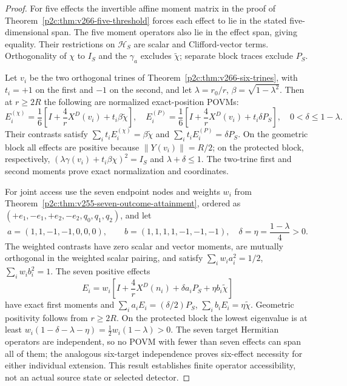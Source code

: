 \documentclass[12pt,a4paper]{article}
\begin{document}
\begin{proof}
For five effects the invertible affine moment matrix in the proof of
Theorem~\ref{p2c:thm:v266-five-threshold} forces each effect to lie
in the stated five-dimensional span. The five moment operators
also lie in the effect span, giving equality. Their restrictions on
$\mathcal H_S$ are scalar and Clifford-vector terms. Orthogonality of
$\chi$ to $I_S$ and the $\gamma_a$ excludes $\widetilde\chi$;
separate block traces exclude $P_S$.

Let $v_i$ be the two orthogonal trines of
Theorem~\ref{p2c:thm:v266-six-trines}, with $t_i=+1$ on the first
and $-1$ on the second, and let $\lambda=r_0/r$, $\beta=\sqrt{1-\lambda^2}$.
Then at $r\ge2R$ the following are normalized exact-position POVMs:
\[
E_i^{(\chi)}=\frac16\left[I+\frac4rX^D(v_i)+t_i\beta\widetilde\chi\right],
\quad
E_i^{(P)}=\frac16\left[I+\frac4rX^D(v_i)+t_i\delta P_S\right],
\quad 0<\delta\le1-\lambda.
\]
Their contrasts satisfy
$\sum_it_iE_i^{(\chi)}=\beta\widetilde\chi$ and
$\sum_it_iE_i^{(P)}=\delta P_S$.
On the geometric block all effects are positive because
$\|Y(v_i)\|=R/2$; on the protected block, respectively,
$(\lambda\gamma(v_i)+t_i\beta\chi)^2=I_S$ and
$\lambda+\delta\le1$. The two-trine first and second moments
prove exact normalization and coordinates.

For joint access use the seven endpoint nodes and weights $w_i$
from Theorem~\ref{p2c:thm:v255-seven-outcome-attainment}, ordered as
$(+e_1,-e_1,+e_2,-e_2,q_0,q_1,q_2)$, and let
\[
a=(1,1,-1,-1,0,0,0),\qquad b=(1,1,1,1,-1,-1,-1),
\quad\delta=\eta=\frac{1-\lambda}{4}>0.
\]
The weighted contrasts have zero scalar and vector moments, are
mutually orthogonal in the weighted scalar pairing, and satisfy
$\sum_iw_ia_i^2=1/2$, $\sum_iw_ib_i^2=1$.
The seven positive effects
\[
\boxed{E_i=w_i\left[I+\frac4rX^D(n_i)+
\delta a_iP_S+\eta b_i\widetilde\chi\right]}
\]
have exact first moments and
$\sum_ia_iE_i=(\delta/2)P_S$,
$\sum_ib_iE_i=\eta\widetilde\chi$.
Geometric positivity follows from $r\ge2R$. On the protected block
the lowest eigenvalue is at least
$w_i(1-\delta-\lambda-\eta)=\frac12w_i(1-\lambda)>0$.
The seven target Hermitian operators are independent, so no POVM with
fewer than seven effects can span all of them; the analogous six-target
independence proves six-effect necessity for either individual extension.
This result establishes finite operator accessibility, not an actual
source state or selected detector.
\end{proof}
\end{document}
